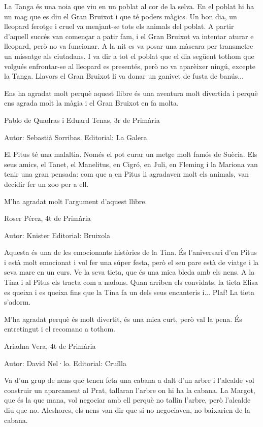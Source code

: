 \begin{shortnews}
{La Tanga és una noia que viu en un poblat al cor de la selva. En el poblat hi ha un mag que es diu el Gran Bruixot i que té poders màgics. Un bon dia, un lleopard ferotge i cruel va menjant-se tots els animals del poblat. A partir d’aquell succés van començar a patir fam, i el Gran Bruixot va intentar aturar e lleopard, però no va funcionar. A la nit es va posar una màscara per transmetre un missatge als ciutadans. I va dir a tot el poblat que el dia següent tothom que volgués enfrontar-se al lleopard es presentés, però no va aparèixer ningú, excepte la Tanga. Llavors el Gran Bruixot li va donar un ganivet de fusta de banús... 

Ens ha agradat molt perquè aquest llibre és una aventura molt divertida i perquè ens agrada molt la màgia i el Gran Bruixot en fa molta.

 Pablo de Quadras i Eduard Tenas,  3r de Primària
}


{
Autor: 	Sebastià Sorribas.  Editorial: La Galera


El Pitus té una malaltia. Només el pot curar un metge molt famós de Suècia. Els seus amics, el Tanet, el Manelitus, en Cigró, en Juli, en Fleming i la Mariona van tenir una gran pensada: com que a en Pitus li agradaven molt els animals, van decidir fer un zoo per a ell.

M’ha agradat molt l’argument d’aquest  llibre.

Roser Pérez, 4t de Primària
}

{
Autor: Knister   Editorial: Bruixola


Aquesta és una de les emocionants històries de la Tina. És l’aniversari d’en Pitus i està molt emocionat i vol fer una súper festa, però el seu pare està de viatge i la seva mare en un curs. Ve la seva tieta, que és una mica bleda  amb els nens. A la Tina i al Pitus els tracta com a nadons. Quan arriben els convidats, la tieta Elisa es queixa i es queixa fins que la Tina fa un dels seus encanteris i... Plaf! La tieta s’adorm.

M’ha agradat perquè és molt divertit, és una mica curt, però val la pena. És entretingut i el recomano a tothom.

Ariadna Vera, 4t de Primària
}

{
Autor: David Nel·lo.   Editorial: Cruïlla

Va d’un grup de nens que tenen feta una cabana a dalt d’un arbre i l’alcalde vol construir un aparcament al Prat, tallaran l’arbre on hi ha la cabana. La Margot, que és la que mana, vol negociar amb ell perquè no tallin l’arbre, però l’alcalde diu que no. Aleshores, els nens van dir que si no negociaven, no baixarien de la cabana. 

}
\end{shortnews}
